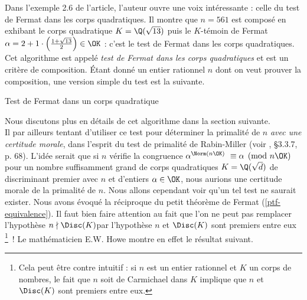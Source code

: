 Dans l'exemple 2.6 de l'article, l'auteur ouvre une voix intéressante : celle du test de Fermat dans les corps quadratiques. Il montre que $n = 561$ est composé en exhibant le corps quadratique $K = \Q(\sqrt{13})$ puis le $K$-témoin de Fermat $\alpha = 2 + 1\cdot \left(\frac{1 + \sqrt{13}}{2}\right) \in \OK$ : c'est le test de Fermat dans les corps quadratiques. Cet algorithme est appelé \emph{test de Fermat dans les corps quadratiques} et est un critère de composition. Étant donné un entier rationnel $n$ dont on veut prouver la composition, une version simple du test est la suivante.

\vspace{1em}
\begin{algorithm}[H]\label{test-Fermat-quadratique}
\caption{Test de Fermat dans un corps quadratique}
\end{algorithm}
\vspace{1em}

Nous discutons plus en détails de cet algorithme dans la section suivante. \\

Il par ailleurs tentant d'utiliser ce test pour déterminer la primalité de $n$ \emph{avec une certitude morale}, dans l'esprit du  test de primalité de Rabin-Miller (voir \cite{Demazure}, §3.3.7, p. 68). L'idée serait que si $n$ vérifie la congruence $\alpha^{\Norm(n\OK)} \equiv \alpha \pmod{n\OK}$ pour un nombre \og suffisamment grand \fg{} de corps quadratiques $K = \Q(\sqrt{d})$ de discriminant premier avec $n$ et d'entiers $\alpha \in \OK$, nous aurions une certitude morale de la primalité de $n$. Nous allons cependant voir qu'un tel test ne saurait exister. Nous avons évoqué la réciproque du petit théorème de Fermat (\ref{ptf-equivalence}). Il faut bien faire attention au fait que l'on ne peut pas remplacer l'hypothèse \og $n \nmid \Disc(K)$\fg par l'hypothèse \og $n$ et $\Disc(K)$ sont premiers entre eux \fg \footnote{Cela peut être contre intuitif : si $n$ est un entier rationnel et $K$ un corps de nombres, le fait que $n$ soit de Carmichael dans $K$ implique que $n$ et $\Disc(K)$ sont premiers entre eux.}~! Le mathématicien E.W. Howe montre en effet le résultat suivant.

